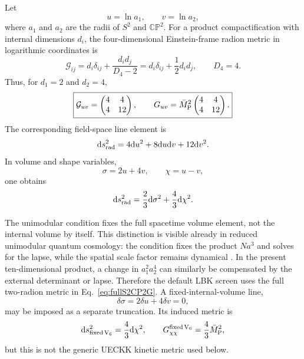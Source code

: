 \documentclass[aps,prd,twocolumn,superscriptaddress,nofootinbib,longbibliography,floatfix]{revtex4-2}
\newcommand{\Mpl}{\bar M_{\rm P}}
\newcommand{\dd}{\mathrm d}
\newcommand{\CP}{\mathbb{CP}}
\begin{document}
Let
\begin{equation}
 u=\ln a_1,\qquad v=\ln a_2,
\end{equation}
where $a_1$ and $a_2$ are the radii of $S^2$ and $\CP^2$. For a product compactification with internal dimensions $d_i$, the four-dimensional Einstein-frame radion metric in logarithmic coordinates is
\begin{equation}
\mathcal G_{ij}=d_i\delta_{ij}+\frac{d_i d_j}{D_4-2}
=d_i\delta_{ij}+\frac12 d_i d_j,
\qquad D_4=4 .
\label{eq:generalradionmetric}
\end{equation}
Thus, for $d_1=2$ and $d_2=4$,
\begin{equation}
\boxed{
\mathcal G_{uv}=\begin{pmatrix}4&4\\4&12\end{pmatrix},
\qquad
G_{uv}=\Mpl^2\begin{pmatrix}4&4\\4&12\end{pmatrix}.
}
\label{eq:fullS2CP2G}
\end{equation}
The corresponding field-space line element is
\begin{equation}
\dd s_{\rm rad}^2=4\dd u^2+8\dd u\dd v+12\dd v^2.
\end{equation}
In volume and shape variables,
\begin{equation}
\sigma=2u+4v,\qquad \chi=u-v,
\end{equation}
one obtains
\begin{equation}
\dd s_{\rm rad}^2=\frac23\dd\sigma^2+\frac43\dd\chi^2.
\label{eq:diagvolshape}
\end{equation}

The unimodular condition fixes the full spacetime volume element, not the internal volume by itself. This distinction is visible already in reduced unimodular quantum cosmology: the condition fixes the product $Na^3$ and solves for the lapse, while the spatial scale factor remains dynamical \cite{Yamashita2026UnimodularQC}. In the present ten-dimensional product, a change in $a_1^2a_2^4$ can similarly be compensated by the external determinant or lapse. Therefore the default LBK screen uses the full two-radion metric in Eq.~\eqref{eq:fullS2CP2G}. A fixed-internal-volume line,
\begin{equation}
\delta\sigma=2\delta u+4\delta v=0,
\end{equation}
may be imposed as a separate truncation. Its induced metric is
\begin{equation}
\dd s_{\rm fixed\,V_6}^2=\frac43\dd\chi^2,
\qquad
G_{\chi\chi}^{\rm fixed\,V_6}=\frac43\Mpl^2,
\label{eq:Gchichi}
\end{equation}
but this is not the generic UECKK kinetic metric used below.
\end{document}
